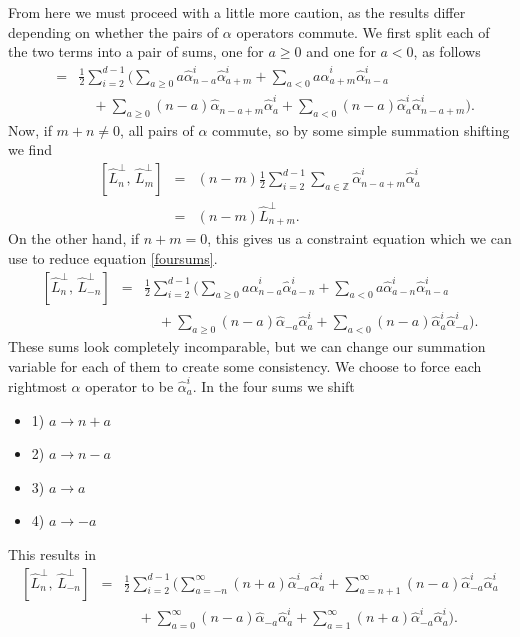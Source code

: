 \documentclass[a4paper,12pt]{article}
\numberwithin{equation}{section}
\begin{document}
From here we must proceed with a little more caution, as the results differ depending on whether the pairs of $\alpha$ operators commute. We first split each of the two terms into a pair of sums, one for $a \geq 0$ and one for $a < 0$, as follows
\begin{eqnarray}\label{foursums}
&=& \frac{1}{2}\sum_{i=2}^{d-1}\Big(\sum_{a \geq0}a\hat{\alpha}_{n-a}^i\hat{\alpha}_{a+m}^i + \sum_{a < 0}a\hat{\alpha}_{a+m}^i\hat{\alpha}_{n-a}^i \\
&& \quad + \sum_{a \geq 0}(n-a)\hat{\alpha}_{n-a+m}\hat{\alpha}_a^i + \sum_{a < 0}(n-a)\hat{\alpha}_a^i\hat{\alpha}_{n-a+m}^i \Big).\nonumber
\end{eqnarray}
Now, if $m+n \ne0$, all pairs of $\alpha$ commute, so by some simple summation shifting we find 
\begin{eqnarray}\label{mneqnvirasorocomm}
\left[\hat{L}_n^\perp,\,\hat{L}_m^\perp\right] &=& (n-m)\frac{1}{2}\sum_{i=2}^{d-1}\sum_{a\in\mathbb{Z}}\hat{\alpha}_{n-a+m}^i\hat{\alpha}_a^i\\
&=& (n-m)\hat{L}_{n+m}^\perp.
\end{eqnarray}
On the other hand, if $n+m=0$, this gives us a constraint equation which we can use to reduce equation \ref{foursums}.
\begin{eqnarray}\label{foursums2}
\left[\hat{L}_n^\perp,\,\hat{L}_{-n}^\perp\right]&=& \frac{1}{2}\sum_{i=2}^{d-1}\Big(\sum_{a \geq0}a\hat{\alpha}_{n-a}^i\hat{\alpha}_{a-n}^i + \sum_{a < 0}a\hat{\alpha}_{a-n}^i\hat{\alpha}_{n-a}^i \\
&& \quad + \sum_{a \geq 0}(n-a)\hat{\alpha}_{-a}\hat{\alpha}_a^i + \sum_{a < 0}(n-a)\hat{\alpha}_a^i\hat{\alpha}_{-a}^i \Big).\nonumber
\end{eqnarray}
These sums look completely incomparable, but we can change our summation variable for each of them to create some consistency. We choose to force each rightmost $\hat{\alpha}$ operator to be $\hat{\alpha}_a^i$. In the four sums we shift
\begin{itemize}
\item{1) $a \to n+a$}
\item{2) $a \to n-a$}
\item{3) $a \to a$}
\item{4) $a \to -a$}
\end{itemize} 
This results in
\begin{eqnarray}\label{foursums3}
\left[\hat{L}_n^\perp,\,\hat{L}_{-n}^\perp\right]&=& \frac{1}{2}\sum_{i=2}^{d-1}\Big(\sum_{a=-n}^\infty (n+a)\hat{\alpha}_{-a}^i\hat{\alpha}_{a}^i + \sum_{a = n+1}^\infty (n-a)\hat{\alpha}_{-a}^i\hat{\alpha}_{a}^i \\
&& \quad + \sum_{a = 0}^\infty(n-a)\hat{\alpha}_{-a}\hat{\alpha}_a^i + \sum_{a =1}^\infty(n+a)\hat{\alpha}_{-a}^i\hat{\alpha}_a^i \Big).\nonumber
\end{eqnarray}
\end{document}
